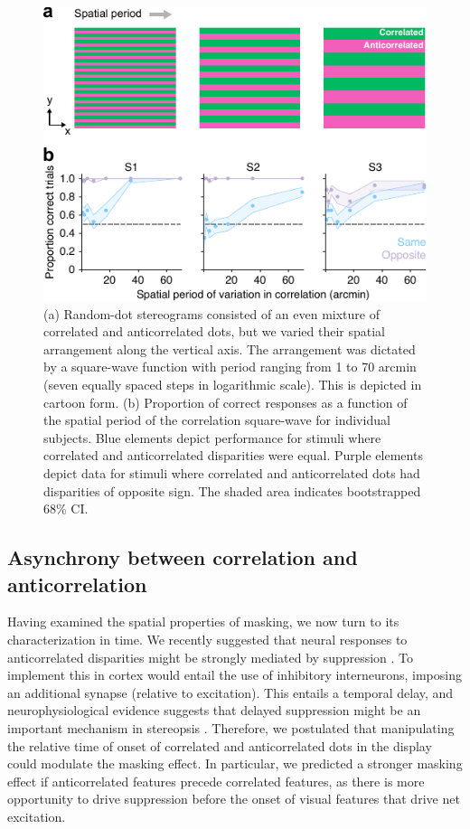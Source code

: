 \begin{figure}
  \centering
  \includegraphics{Fig5}
  \caption[Effect of visuotopic distance between correlated and anticorrelated dots.]{(a) Random-dot stereograms consisted of an even mixture of correlated and anticorrelated dots, but we varied their spatial arrangement along the vertical axis. The arrangement was dictated by a square-wave function with period ranging from 1 to 70 arcmin (seven equally spaced steps in logarithmic scale). This is depicted in cartoon form. (b) Proportion of correct responses as a function of the spatial period of the correlation square-wave for individual subjects. Blue elements depict performance for stimuli where correlated and anticorrelated disparities were equal. Purple elements depict data for stimuli where correlated and anticorrelated dots had disparities of opposite sign. The shaded area indicates bootstrapped 68\% CI.}
  \label{fig:c2f5}
\end{figure}


\subsection{Asynchrony between correlation and anticorrelation}
Having examined the spatial properties of masking, we now turn to its characterization in time. We recently suggested that neural responses to anticorrelated disparities might be strongly mediated by suppression \cite{Goncalves:2017aa}. To implement this in cortex would entail the use of inhibitory interneurons, imposing an additional synapse (relative to excitation). This entails a temporal delay, and neurophysiological evidence suggests that delayed suppression might be an important mechanism in stereopsis \cite{Tanabe:2011pt,Tanabe:2014ud}. Therefore, we postulated that manipulating the relative time of onset of correlated and anticorrelated dots in the display could modulate the masking effect. In particular, we predicted a stronger masking effect if anticorrelated features precede correlated features, as there is more opportunity to drive suppression before the onset of visual features that drive net excitation.

